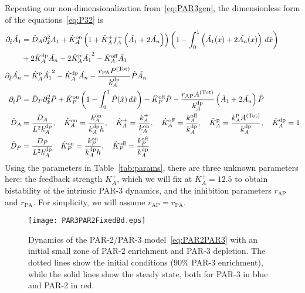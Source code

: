 \documentclass[11pt]{article}
\newcommand{\6}[1]{#1_{\text{6}}}
\newcommand{\3}[1]{#1_{\text{3}}}
\newcommand{\Tot}[1]{#1^\text{(Tot)}}
\newcommand{\A}[1]{#1_A}
\begin{document}
Repeating our non-dimensionalization from\ \eqref{eq:PAR3gen}, the dimensionless form of the equations\ \eqref{eq:P32} is
\begin{subequations}
\label{eq:PAR2PAR3}
\begin{align}
\nonumber
\Dthat \hat{\MA} & = \DhatA \Dxhat^2 \MA +\KhatonA \left(1+\KhatfA \A{f}^+\left(\hat{\MA}+2\hat{\PA}\right)\right)\left(1 - \int_0^1 \left(\hat{\MA}(x) + 2\hat{\PA}(x)\right) \, d\hat{x} \right) \\ 
&+ 2\KhatdpA \hat{\PA}-2\KhatpA \hat{\MA}^2 - \KhatoffA \hat{\MA} \\ 
\Dthat \hat{\PA} & =\KhatpA \hat{\MA}^2- \KhatdpA \hat{\PA}-\frac{r_\text{PA} \Tot{P}}{\kdp_A}\hat{P} \hat{\PA} \\ 
\Dthat \hat{P} & =\DhatP \Dxhat^2 \hat{P} +\KhatonP \left(1 - \int_0^1 \hat{P}(\hat x) \, d\hat{x} \right)  - \KhatoffP \hat{P}-\frac{r_\text{AP} \Tot{A}}{\kdp_A}\left(\hat A_1 + 2\hat \PA\right)\hat{P} \\ 
\label{eq:paramsNDFB}
\DhatA &=\frac{\A{D}}{L^2 \A{\kdp}}, \quad \KhatonA=\frac{\A{\kon}}{\A{\kdp} h }, \quad \KhatfA = \frac{\A{\kf}}{\A{\kon}}, \quad  \KhatoffA = \frac{\A{\koff}}{\A{\kdp}}, \quad \KhatpA = \frac{\A{\kp} \Tot{A}}{\A{\kdp}}, \quad \KhatdpA=1\\
\DhatP &=\frac{D_P}{L^2 \A{\kdp}} \quad \KhatonP=\frac{{\kon_P}}{\A{\kdp} h },\quad \KhatoffP = \frac{\koff_P}{\kdp_A}
\end{align}
\end{subequations}
Using the parameters in Table\ \ref{tab:params}, there are three unknown parameters here: the feedback strength $K_A^+$, which we will fix at $K_A^+=12.5$ to obtain bistability of the intrinsic PAR-3 dynamics, and the inhibition parameters $r_\text{AP}$ and $r_\text{PA}$. For simplicity, we will assume $r_\text{AP}=r_\text{PA}$. 


\begin{figure}
\centering
\texttt{[image: PAR3PAR2FixedBd.eps]}
\caption{\label{fig:P32FixBd}Dynamics of the PAR-2/PAR-3 model\ \eqref{eq:PAR2PAR3} with an initial small zone of PAR-2 enrichment and PAR-3 depletion. The dotted lines show the initial conditions (90\% PAR-3 enrichment), while the solid lines show the steady state, both for PAR-3 in blue and PAR-2 in red.}
\end{figure}
\end{document}
